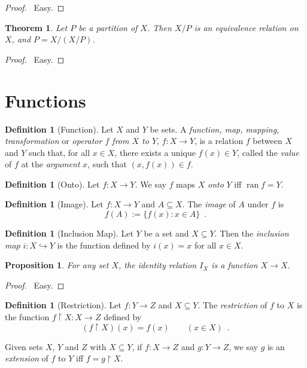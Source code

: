 \documentclass{report}
\let\qed\relax
\newtheorem{prop}[ax]{Proposition}
\newtheorem{thm}[ax]{Theorem}
\theoremstyle{definition}
\newtheorem{df}[ax]{Definition}
\newcommand{\ran}{\ensuremath{\operatorname{ran}}}
\begin{document}
\begin{proof}
\pf\ Easy. \qed
\end{proof}

\begin{thm}
Let $P$ be a partition of $X$. Then $X / P$ is an equivalence relation on $X$, and $P = X / (X / P)$.
\end{thm}

\begin{proof}
\pf\ Easy. \qed
\end{proof}

\section{Functions}

\begin{df}[Function]
Let $X$ and $Y$ be sets. A \emph{function, map, mapping, transformation} or \emph{operator $f$ from $X$ to $Y$}, $f : X \rightarrow Y$, is a relation $f$ between $X$ and $Y$ such that, for all $x \in X$, there exists a unique $f(x) \in Y$, called the \emph{value} of $f$ at the \emph{argument} $x$, such that $(x,f(x)) \in f$.
\end{df}

\begin{df}[Onto]
Let $f : X \rightarrow Y$. We say $f$ maps $X$ \emph{onto} $Y$ iff $\ran f = Y$.
\end{df}

\begin{df}[Image]
Let $f : X \rightarrow Y$ and $A \subseteq X$. The \emph{image} of $A$ under $f$ is
\[ f(A) := \{ f(x) : x \in A \} \enspace . \]
\end{df}

\begin{df}[Inclusion Map]
Let $Y$ be a set and $X \subseteq Y$. Then the \emph{inclusion map} $i : X \hookrightarrow Y$ is the function defined by $i(x) = x$ for all $x \in X$.
\end{df}

\begin{prop}
For any set $X$, the identity relation $I_X$ is a function $X \rightarrow X$.
\end{prop}

\begin{proof}
\pf\ Easy. \qed
\end{proof}

\begin{df}[Restriction]
Let $f : Y \rightarrow Z$ and $X \subseteq Y$. The \emph{restriction} of $f$ to $X$ is the function $f \restriction X : X \rightarrow Z$ defined by
\[ (f \restriction X)(x) = f(x) \qquad (x \in X) \enspace . \]

Given sets $X$, $Y$ and $Z$ with $X \subseteq Y$, if $f : X \rightarrow Z$ and $g : Y \rightarrow Z$, we say $g$ is an \emph{extension} of $f$ to $Y$ iff $f = g \restriction X$.
\end{df}
\end{document}
